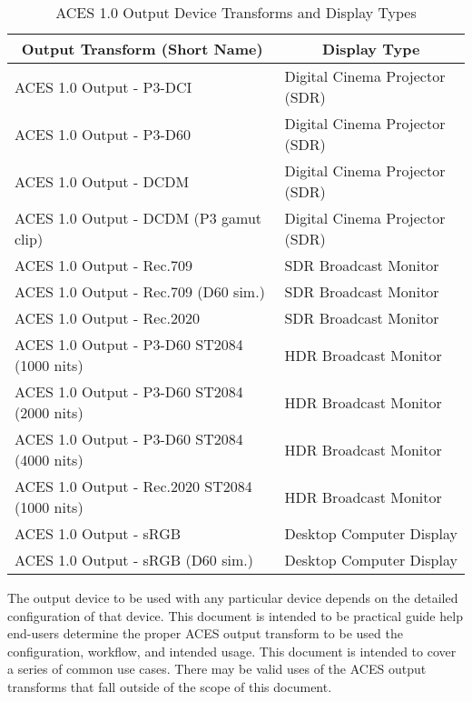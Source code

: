 \begin{table}[ht!]
\centering
\begin{tabular}{cc}
\textbf{Output Transform (Short Name)}                              & \textbf{Display Type}                               \\ \hline
\multicolumn{1}{|l|}{ACES 1.0 Output - P3-DCI}                      & \multicolumn{1}{l|}{Digital Cinema Projector (SDR)} \\ \hline
\multicolumn{1}{|l|}{ACES 1.0 Output - P3-D60}                      & \multicolumn{1}{l|}{Digital Cinema Projector (SDR)} \\ \hline
\multicolumn{1}{|l|}{ACES 1.0 Output - DCDM}                        & \multicolumn{1}{l|}{Digital Cinema Projector (SDR)} \\ \hline
\multicolumn{1}{|l|}{ACES 1.0 Output - DCDM (P3 gamut clip)}        & \multicolumn{1}{l|}{Digital Cinema Projector (SDR)} \\ \hline
\multicolumn{1}{|l|}{ACES 1.0 Output - Rec.709}                     & \multicolumn{1}{l|}{SDR Broadcast Monitor}          \\ \hline
\multicolumn{1}{|l|}{ACES 1.0 Output - Rec.709 (D60 sim.)}          & \multicolumn{1}{l|}{SDR Broadcast Monitor}          \\ \hline
\multicolumn{1}{|l|}{ACES 1.0 Output - Rec.2020}                    & \multicolumn{1}{l|}{SDR Broadcast Monitor}          \\ \hline
\multicolumn{1}{|l|}{ACES 1.0 Output - P3-D60 ST2084 (1000 nits)}   & \multicolumn{1}{l|}{HDR Broadcast Monitor}          \\ \hline
\multicolumn{1}{|l|}{ACES 1.0 Output - P3-D60 ST2084 (2000 nits)}   & \multicolumn{1}{l|}{HDR Broadcast Monitor}          \\ \hline
\multicolumn{1}{|l|}{ACES 1.0 Output - P3-D60 ST2084 (4000 nits)}   & \multicolumn{1}{l|}{HDR Broadcast Monitor}          \\ \hline
\multicolumn{1}{|l|}{ACES 1.0 Output - Rec.2020 ST2084 (1000 nits)} & \multicolumn{1}{l|}{HDR Broadcast Monitor}          \\ \hline
\multicolumn{1}{|l|}{ACES 1.0 Output - sRGB}                        & \multicolumn{1}{l|}{Desktop Computer Display}       \\ \hline
\multicolumn{1}{|l|}{ACES 1.0 Output - sRGB (D60 sim.)}             & \multicolumn{1}{l|}{Desktop Computer Display}       \\ \hline
\end{tabular}
\caption[ACES 1.0 Output Device Transforms and Display Types]{ACES 1.0 Output Device Transforms and Display Types}
\label{odt-display-types-table}
\end{table}

The output device to be used with any particular device depends on the detailed configuration of that device.  This document is intended to be practical guide help end-users determine the proper ACES output transform to be used the configuration, workflow, and intended usage.  This document is intended to cover a series of common use cases.  There may be valid uses of the ACES output transforms that fall outside of the scope of this document.
